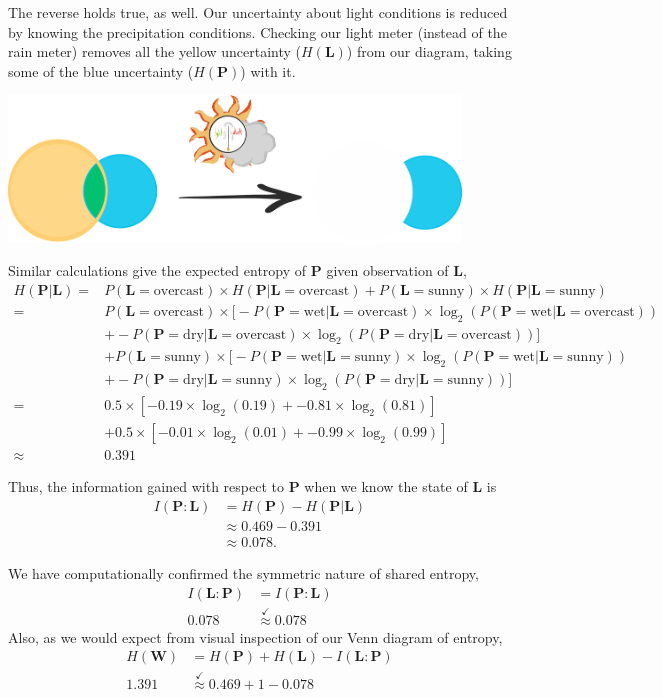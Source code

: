 The reverse holds true, as well.
Our uncertainty about light conditions is reduced by knowing the precipitation conditions.
Checking our light meter (instead of the rain meter) removes all the yellow uncertainty ($H(\bm{L})$) from our diagram, taking some of the blue uncertainty ($H(\bm{P})$) with it.
\begin{center}
  \includegraphics[trim= 0 0 0 0, clip, width=0.9\textwidth]{img/sun-meter-peek}
\end{center}
Similar calculations give the expected entropy of $\bm{P}$ given observation of $\bm{L}$,
\begin{align*}
H(\bm{P} | \bm{L})
=&
P(\bm{L} = \text{overcast}) \times H(\bm{P} | \bm{L} = \text{overcast})
+ P(\bm{L} = \text{sunny}) \times H(\bm{P} | \bm{L} = \text{sunny}) \\
=&
P(\bm{L} = \text{overcast}) \times \Big[ - P(\bm{P} = \text{wet} | \bm{L} = \text{overcast}) \times \log_2(P(\bm{P} = \text{wet} | \bm{L} = \text{overcast})) \\
&+ - P(\bm{P} = \text{dry} | \bm{L} = \text{overcast}) \times \log_2(P(\bm{P} = \text{dry} | \bm{L} = \text{overcast})) \Big] \\
&+ P(\bm{L} = \text{sunny})\times \Big[ - P(\bm{P} = \text{wet} | \bm{L} = \text{sunny}) \times \log_2(P(\bm{P} = \text{wet} | \bm{L} = \text{sunny})) \\
&+ - P(\bm{P} = \text{dry} | \bm{L} = \text{sunny}) \times \log_2(P(\bm{P} = \text{dry} | \bm{L} = \text{sunny})) \Big] \\
=&
0.5 \times [ - 0.19 \times \log_2(0.19) + - 0.81 \times \log_2(0.81) ] \\
&+ 0.5 \times [ - 0.01 \times \log_2(0.01) + - 0.99 \times \log_2(0.99) ] \\
\approx&
0.391
\end{align*}

Thus, the information gained with respect to $\bm{P}$ when we know the state of $\bm{L}$ is
\begin{align*}
I(\bm{P} : \bm{L})
&=
H(\bm{P}) - H(\bm{P} | \bm{L}) \\
&\approx
0.469 - 0.391 \\
&\approx
0.078.
\end{align*}

We have computationally confirmed the symmetric nature of shared entropy,
\begin{align*}
I(\bm{L} : \bm{P})
&=
I(\bm{P} : \bm{L}) \\
0.078
&\stackrel{\checkmark}{\approx}
0.078
\end{align*}
Also, as we would expect from visual inspection of our Venn diagram of entropy,
\begin{align*}
H(\bm{W})
&=
H(\bm{P}) + H(\bm{L}) - I(\bm{L} : \bm{P}) \\
1.391
&\stackrel{\checkmark}{\approx}
0.469 + 1 - 0.078
\end{align*}
